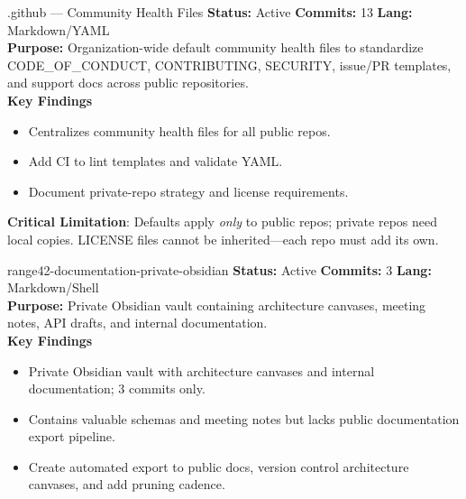 \documentclass[aspectratio=169]{beamer}
\begin{document}
\begin{frame}{.github — Community Health Files \; \faUsers}
  \textbf{Status:} Active \hfill \textbf{Commits:} 13 \hfill \textbf{Lang:} Markdown/YAML\\[2mm]
  \textbf{Purpose:} Organization-wide default community health files to standardize CODE\_OF\_CONDUCT, CONTRIBUTING, SECURITY, issue/PR templates, and support docs across public repositories.\\[2mm]
  \textbf{Key Findings}
  \begin{itemize}
    \item Centralizes community health files for all public repos.
    \item Add CI to lint templates and validate YAML.
    \item Document private-repo strategy and license requirements.
  \end{itemize}
  \begin{tcolorbox}
    \faExclamationTriangle\; \textbf{Critical Limitation}: Defaults apply \emph{only} to public repos; private repos need local copies. LICENSE files cannot be inherited—each repo must add its own.
  \end{tcolorbox}
\end{frame}

\begin{frame}{range42-documentation-private-obsidian \; \faBook}
  \textbf{Status:} Active \hfill \textbf{Commits:} 3 \hfill \textbf{Lang:} Markdown/Shell\\[2mm]
  \textbf{Purpose:} Private Obsidian vault containing architecture canvases, meeting notes, API drafts, and internal documentation.\\[2mm]
  \textbf{Key Findings}
  \begin{itemize}
    \item Private Obsidian vault with architecture canvases and internal documentation; 3 commits only.
    \item Contains valuable schemas and meeting notes but lacks public documentation export pipeline.
    \item Create automated export to public docs, version control architecture canvases, and add pruning cadence.
  \end{itemize}
\end{frame}
\end{document}
